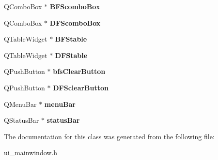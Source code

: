 \begin{DoxyCompactItemize}
Q\+Combo\+Box $\ast$ {\bfseries B\+F\+Scombo\+Box}
\item 
\mbox{\label{class_ui___main_window_a98941b1be95cfda7e0245a8a1e084001}} 
Q\+Combo\+Box $\ast$ {\bfseries D\+F\+Scombo\+Box}
\item 
\mbox{\label{class_ui___main_window_a25bfeb989e7757783b83516b94fc9003}} 
Q\+Table\+Widget $\ast$ {\bfseries B\+F\+Stable}
\item 
\mbox{\label{class_ui___main_window_ab712a9480a2f4ca6ae27685f45240876}} 
Q\+Table\+Widget $\ast$ {\bfseries D\+F\+Stable}
\item 
\mbox{\label{class_ui___main_window_af43458cacc6e5713303cd8be5b413dd7}} 
Q\+Push\+Button $\ast$ {\bfseries bfs\+Clear\+Button}
\item 
\mbox{\label{class_ui___main_window_aa1e84cc66484fb63f294b468ceac5af6}} 
Q\+Push\+Button $\ast$ {\bfseries D\+F\+Sclear\+Button}
\item 
\mbox{\label{class_ui___main_window_a2be1c24ec9adfca18e1dcc951931457f}} 
Q\+Menu\+Bar $\ast$ {\bfseries menu\+Bar}
\item 
\mbox{\label{class_ui___main_window_a50fa481337604bcc8bf68de18ab16ecd}} 
Q\+Status\+Bar $\ast$ {\bfseries status\+Bar}
\end{DoxyCompactItemize}


The documentation for this class was generated from the following file\+:\begin{DoxyCompactItemize}
\item 
ui\+\_\+mainwindow.\+h\end{DoxyCompactItemize}
